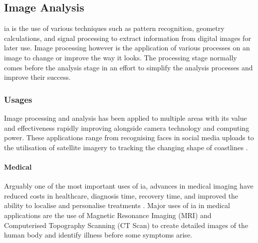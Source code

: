 \subsection{Image Analysis}
	\gls{ia} is the use of various techniques such as pattern recognition, geometry calculations, and signal processing to extract information from digital images for later use. Image processing however is the application of various processes on an image to change or improve the way it looks. The processing stage normally comes before the analysis stage in an effort to simplify the analysis processes and improve their success.
	\subsubsection{Usages}
	Image processing and analysis has been applied to multiple areas with its value and effectiveness rapidly improving alongside camera technology and computing power. These applications range from recognising faces in social media uploads \citep{zuckerberg2011tagging} to the utilisation of satellite imagery to tracking the changing shape of coastlines \citep{costalimagery}.
	\paragraph{Medical}
	Arguably one of the most important uses of \gls{ia}, advances in medical imaging have reduced costs in healthcare, diagnosis time, recovery time, and improved the ability to localise and personalise treatments \citep{esfmedical}. Major uses of \gls{ia} in medical applications are the use of Magnetic Resonance Imaging (MRI) and Computerised Topography Scanning (CT Scan) to create detailed images of the human body and identify illness before some symptoms arise.

